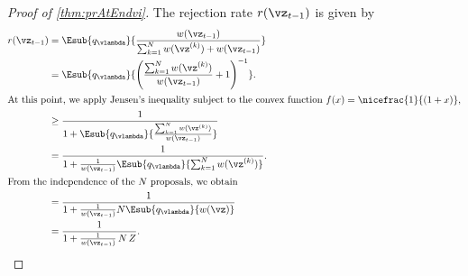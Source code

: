 \prAtEndRestatevi*
\label{proofsection:prAtEndvi}\begin{proof}[Proof of \autoref{thm:prAtEndvi}]\label{proof:prAtEndvi}The rejection rate \(r(\vz _{t-1})\) is given by \begin {align} r(\vz _{t-1}) &= \Esub {q_{\vlambda }}{ \frac {w(\vz _{t-1})}{ \sum ^{N}_{k=1} w(\vz ^{(k)}) + w(\vz _{t-1})} } \\ &= \Esub {q_{\vlambda }}{ {\left ( \frac {\sum ^{N}_{k=1} w(\vz ^{(k)}) }{ w(\vz _{t-1}) } + 1 \right )}^{-1} }. \\ \intertext {At this point, we apply Jensen's inequality subject to the convex function \(f(x) = \nicefrac {1}{(1 + x)}\),} &\geq \frac {1}{1 + \Esub {q_{\vlambda }}{ \frac {\sum ^{N}_{k=1} w(\vz ^{(k)})}{w(\vz _{t-1})} } } \\ &= \frac {1}{1 + \frac {1}{w(\vz _{t-1})} \Esub {q_{\vlambda }}{ \sum ^{N}_{k=1} w(\vz ^{(k)}) } }. \\ \intertext {From the independence of the \(N\) proposals, we obtain} &= \frac {1}{1 + \frac {1}{w(\vz _{t-1})} N \Esub {q_{\vlambda }}{ w(\vz ) } } \\ &= \frac {1}{1 + \frac {1}{w(\vz _{t-1})}\,N\,Z }.\end {align}\end{proof}
\prAtEndRestatevii*
